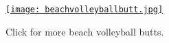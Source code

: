 
\captionsetup[figure]{labelformat=empty}
\begin{figure}[htbp]
\centering
\href{http://www.examiner.com/slideshow/best-olympic-beach-volleyball-butts\#slide=51089666}{\texttt{[image: beachvolleyballbutt.jpg]}}
\caption{Click for more beach volleyball butts.}
\label{fig:3116X0}
\end{figure}





%